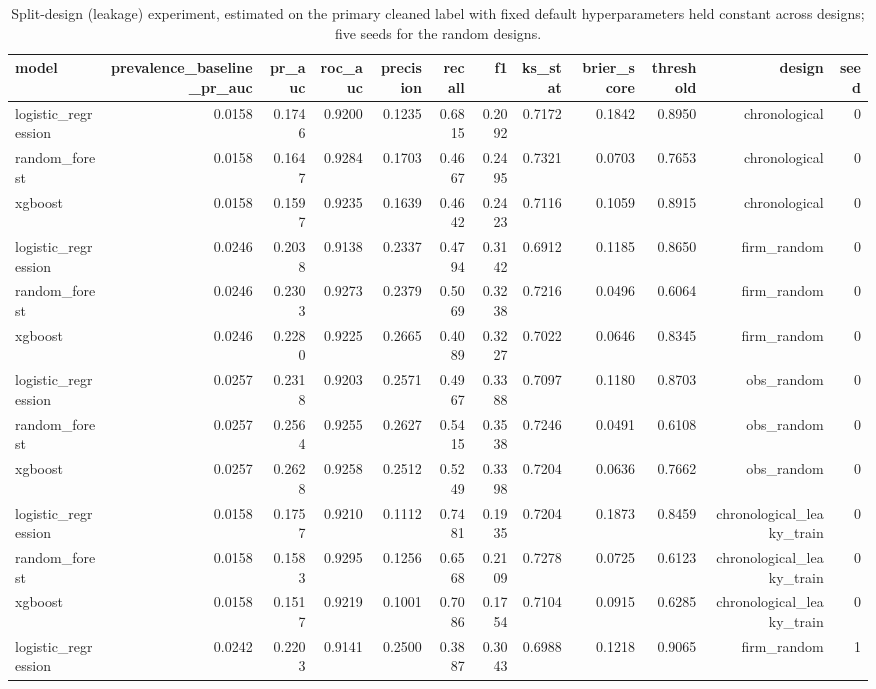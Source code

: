 \begin{table}[htbp]
\centering
\caption{Split-design (leakage) experiment, estimated on the primary cleaned label with fixed default hyperparameters held constant across designs; five seeds for the random designs.}
\label{tab:v2_h2_results}
\small
\begin{tabular}{lrrrrrrrrrrr}
\toprule
model & prevalence\_baseline\_pr\_auc & pr\_auc & roc\_auc & precision & recall & f1 & ks\_stat & brier\_score & threshold & design & seed \\
\midrule
logistic\_regression & 0.0158 & 0.1746 & 0.9200 & 0.1235 & 0.6815 & 0.2092 & 0.7172 & 0.1842 & 0.8950 & chronological & 0 \\
random\_forest & 0.0158 & 0.1647 & 0.9284 & 0.1703 & 0.4667 & 0.2495 & 0.7321 & 0.0703 & 0.7653 & chronological & 0 \\
xgboost & 0.0158 & 0.1597 & 0.9235 & 0.1639 & 0.4642 & 0.2423 & 0.7116 & 0.1059 & 0.8915 & chronological & 0 \\
logistic\_regression & 0.0246 & 0.2038 & 0.9138 & 0.2337 & 0.4794 & 0.3142 & 0.6912 & 0.1185 & 0.8650 & firm\_random & 0 \\
random\_forest & 0.0246 & 0.2303 & 0.9273 & 0.2379 & 0.5069 & 0.3238 & 0.7216 & 0.0496 & 0.6064 & firm\_random & 0 \\
xgboost & 0.0246 & 0.2280 & 0.9225 & 0.2665 & 0.4089 & 0.3227 & 0.7022 & 0.0646 & 0.8345 & firm\_random & 0 \\
logistic\_regression & 0.0257 & 0.2318 & 0.9203 & 0.2571 & 0.4967 & 0.3388 & 0.7097 & 0.1180 & 0.8703 & obs\_random & 0 \\
random\_forest & 0.0257 & 0.2564 & 0.9255 & 0.2627 & 0.5415 & 0.3538 & 0.7246 & 0.0491 & 0.6108 & obs\_random & 0 \\
xgboost & 0.0257 & 0.2628 & 0.9258 & 0.2512 & 0.5249 & 0.3398 & 0.7204 & 0.0636 & 0.7662 & obs\_random & 0 \\
logistic\_regression & 0.0158 & 0.1757 & 0.9210 & 0.1112 & 0.7481 & 0.1935 & 0.7204 & 0.1873 & 0.8459 & chronological\_leaky\_train & 0 \\
random\_forest & 0.0158 & 0.1583 & 0.9295 & 0.1256 & 0.6568 & 0.2109 & 0.7278 & 0.0725 & 0.6123 & chronological\_leaky\_train & 0 \\
xgboost & 0.0158 & 0.1517 & 0.9219 & 0.1001 & 0.7086 & 0.1754 & 0.7104 & 0.0915 & 0.6285 & chronological\_leaky\_train & 0 \\
logistic\_regression & 0.0242 & 0.2203 & 0.9141 & 0.2500 & 0.3887 & 0.3043 & 0.6988 & 0.1218 & 0.9065 & firm\_random & 1 \\

\end{tabular}
\end{table}
